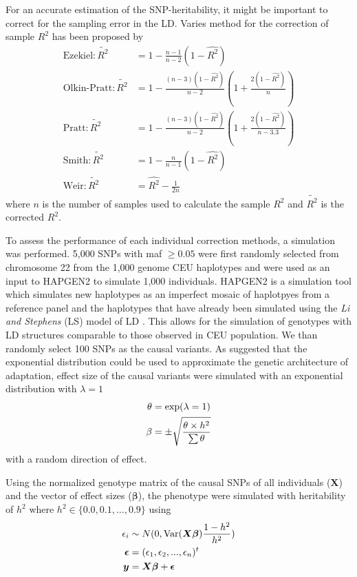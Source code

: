 \documentclass[12pt]{scrbook}
\begin{document}
For an accurate estimation of the \gls{SNP}-heritability, it might be important to correct for the sampling error in the \gls{LD}.
Varies method for the correction of sample $R^2$ has been proposed by \citet{Weir1980,Wang2007}
\begin{align}
\text{Ezekiel}: \tilde{R^2}&= 1-\frac{n-1}{n-2}(1-\hat{R^2})\label{eq:ezekiel} \\
\text{Olkin-Pratt}: \tilde{R^2}&=1-\frac{(n-3)(1-\hat{R^2})}{n-2}(1+\frac{2(1-\hat{R^2})}{n})\label{eq:okin} \\
\text{Pratt}: \tilde{R^2}&=1-\frac{(n-3)(1-\hat{R^2})}{n-2}(1+\frac{2(1-\hat{R^2})}{n-3.3})\label{eq:pratt} \\
\text{Smith}: \tilde{R^2}&=1-\frac{n}{n-1}(1-\hat{R^2}) \label{eq:smith}\\
\text{Weir}: \tilde{R^2}&=\hat{R^2}-\frac{1}{2n} \label{eq:weir}
\end{align}
where $n$ is the number of samples used to calculate the sample $R^2$ and $\tilde{R^2}$ is the corrected $R^2$.
	
To assess the performance of each individual correction methods, a simulation was performed. 	
5,000 \glspl{SNP} with \gls{maf} $\ge0.05$ were first randomly selected from chromosome 22 from the 1,000 genome \gls{CEU} haplotypes and were used as an input to HAPGEN2 \citep{Su2011} to simulate 1,000 individuals.
HAPGEN2 is a simulation tool which simulates new haplotypes as an imperfect mosaic of haplotpyes from a reference panel and the haplotypes that have already been simulated using the \textit{Li and Stephens} (LS) model of \gls{LD} \citep{Li2003}.
This allows for the simulation of genotypes with \gls{LD} structures comparable to those observed in \gls{CEU} population. 
We than randomly select 100 \glspl{SNP} as the causal variants.
As \citet{Orr1998} suggested that the exponential distribution could be used to approximate the genetic architecture of adaptation, effect size of the causal variants were simulated with an exponential distribution with $\lambda=1$
\begin{align}
\theta&=\mathrm{exp}(\lambda=1)\notag\\
\beta&=\pm\sqrt{\frac{\theta \times h^2}{\sum \theta}}
\label{eq:randomEffect}
\end{align}
with a random direction of effect.

Using the normalized genotype matrix of the causal \glspl{SNP} of all individuals ($\boldsymbol{X}$) and the vector of effect sizes ($\boldsymbol{\beta}$), the phenotype were simulated with heritability of $h^2$ where $h^2\in\{0.0,0.1,\dots,0.9\}$ using
\begin{align}
\epsilon_i&\sim N(0,\mathrm{Var}(\boldsymbol{X\beta})\frac{1-h^2}{h^2} )\notag\\
\boldsymbol{\epsilon} &= (\epsilon_1,\epsilon_2,...,\epsilon_n)^t\notag\\
\boldsymbol{y} &= \boldsymbol{X\beta}+\boldsymbol{\epsilon}
\label{eq:simulationOfPhenotype}
\end{align}
\end{document}
